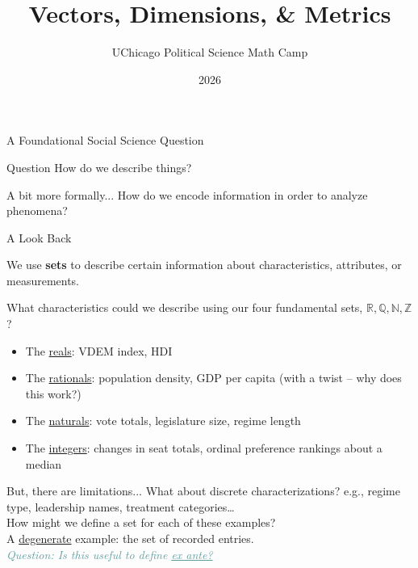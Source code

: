 \documentclass[10pt]{beamer}
\title{Vectors, Dimensions, \& Metrics}
\author{UChicago Political Science Math Camp}
\institute{Ryan Gibbons}
\date{2026}
\begin{document}
\frame{\titlepage}

\begin{frame}{A Foundational Social Science Question}
    \begin{block}{Question}
        How do we describe things?
    \end{block}
    \pause
    \vspace{.5cm}
    \begin{block}{A bit more formally...}
        How do we encode information in order to analyze phenomena?
    \end{block}
\end{frame}


\begin{frame}{A Look Back}
\begin{block}{}
We use \textbf{sets} to describe certain information about characteristics, attributes, or measurements.
\end{block}
\vspace{.3cm}
What characteristics could we describe using our four fundamental sets, $\mathbb{R}, \mathbb{Q}, \mathbb{N}, \mathbb{Z}$? \\
\pause
\vspace{.3cm}
\begin{itemize}
    \item The \underline{reals}: VDEM index, HDI
    \item The \underline{rationals}: population density, GDP per capita (with a twist -- why does this work?)
    \item The \underline{naturals}: vote totals, legislature size, regime length
    \item The \underline{integers}: changes in seat totals, ordinal preference rankings about a median
\end{itemize}

\end{frame}

\begin{frame}{But, there are limitations...}
    What about discrete characterizations? e.g., regime type, leadership names, treatment categories\dots \\
    \vspace{.5cm}
    How might we define a set for each of these examples? \\ \pause
    \vspace{1.5cm}
    A \underline{degenerate} example: the set of recorded entries. \\ \emph{\textcolor{CadetBlue}{Question: Is this useful to define \underline{ex ante?}}} %
\end{frame}
\end{document}
